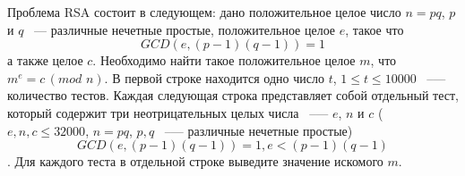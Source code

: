 Проблема RSA состоит в следующем:
дано положительное целое число $n = pq$, $p$ и $q$ ~---
различные нечетные простые,
положительное целое $e$, такое что $$GCD(e, (p-1)(q-1)) = 1$$
а также целое $c$. Необходимо найти такое положительное целое $m$,
что $m^e = c \, (mod \,\,n)$.
\InputFile
В первой строке находится одно число $t$,
$1 \le t \le 10000$ ~--— количество тестов.
Каждая следующая строка представляет собой отдельный тест,
который содержит три неотрицательных целых числа ~--— $e$, $n$ и $c$
($e, n, c \le 32000$, $n = pq$, $p, q$ ~--— различные нечетные простые)
$$GCD(e, (p-1)(q-1)) = 1, e < (p-1)(q-1)$$.
\OutputFile
Для каждого теста в отдельной строке выведите значение искомого $m$.

